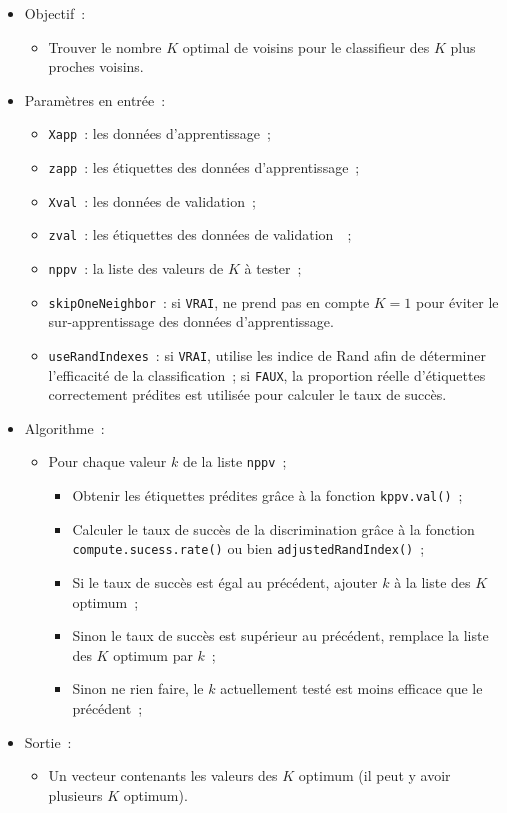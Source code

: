 \documentclass[a4paper,10pt]{report}
\begin{document}
\begin{itemize}
	\item Objectif~:
	\begin{itemize}
		\item Trouver le nombre $K$ optimal de voisins pour le classifieur des $K$ plus proches voisins.
	\end{itemize}
	
	\item Paramètres en entrée~:
	\begin{itemize}
		\item \texttt{Xapp}~: les données d'apprentissage~;
		\item \texttt{zapp}~: les étiquettes des données d'apprentissage~;
		\item \texttt{Xval}~: les données de validation~;
		\item \texttt{zval}~: les étiquettes des données de validation~~;
		\item \texttt{nppv}~: la liste des valeurs de $K$ à tester~;
		\item \texttt{skipOneNeighbor}~: si \texttt{VRAI}, ne prend pas en compte $K=1$ pour éviter le sur-apprentissage des données d'apprentissage.
		\item \texttt{useRandIndexes}~: si \texttt{VRAI}, utilise les indice de Rand afin de déterminer l'efficacité de la classification~; si \texttt{FAUX}, la proportion réelle d'étiquettes correctement prédites est utilisée pour calculer le taux de succès.
	\end{itemize}
	
	\item Algorithme~:
	\begin{itemize}
		\item Pour chaque valeur $k$ de la liste \texttt{nppv}~;
		\begin{itemize}
			\item Obtenir les étiquettes prédites grâce à la fonction \texttt{kppv.val()}~;
			\item Calculer le taux de succès de la discrimination grâce à la fonction \texttt{compute.sucess.rate()} ou bien \texttt{adjustedRandIndex()}~;
			\item Si le taux de succès est égal au précédent, ajouter $k$ à la liste des $K$ optimum~;
			\item Sinon le taux de succès est supérieur au précédent, remplace la liste des $K$ optimum par $k$~;
			\item Sinon ne rien faire, le $k$ actuellement testé est moins efficace que le précédent~;
		\end{itemize}
	\end{itemize}
	
	\item Sortie~:
	\begin{itemize}
		\item Un vecteur contenants les valeurs des $K$ optimum (il peut y avoir plusieurs $K$ optimum).
	\end{itemize}
\end{itemize}
\end{document}

